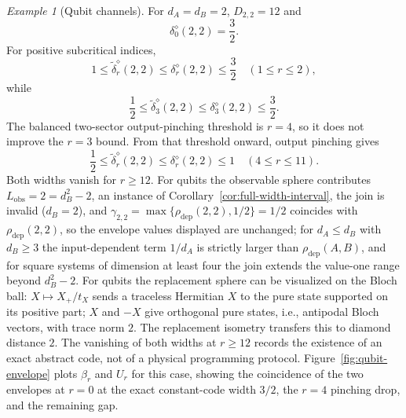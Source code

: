 \documentclass[11pt,a4paper]{article}
\theoremstyle{definition}
\theoremstyle{plain}
\theoremstyle{remark}
\newtheorem{example}[theorem]{Example}
\newcommand{\rhodep}{\rho_{\mathrm{dep}}}
\begin{document}
\begin{example}[Qubit channels]
\label{ex:qubit}
For $d_A=d_B=2$, $D_{2,2}=12$ and
\[
\delta_0^\diamond(2,2)=\frac32.
\]
For positive subcritical indices,
\[
1\leq\widetilde\delta_r^\diamond(2,2)
\leq\delta_r^\diamond(2,2)\leq\frac32
\quad(1\leq r\leq2),
\]
while
\[
\frac12\leq\widetilde\delta_3^\diamond(2,2)
\leq\delta_3^\diamond(2,2)\leq\frac32.
\]
The balanced two-sector output-pinching threshold is $r=4$, so it does not
improve the $r=3$ bound. From that threshold onward, output pinching gives
\[
\frac12\leq\widetilde\delta_r^\diamond(2,2)
\leq\delta_r^\diamond(2,2)\leq1
\quad(4\leq r\leq11).
\]
Both widths vanish for $r\geq12$. For qubits the observable sphere contributes $L_{\mathrm{obs}}=2=d_B^2-2$, an instance of Corollary~\ref{cor:full-width-interval}, the join is invalid ($d_B=2$), and $\gamma_{2,2}=\max\{\rhodep(2,2),1/2\}=1/2$ coincides with $\rhodep(2,2)$, so the envelope values displayed are unchanged; for $d_A\le d_B$ with $d_B\ge3$ the input-dependent term $1/d_A$ is strictly larger than $\rhodep(A,B)$, and for square systems of dimension at least four the join extends the value-one range beyond $d_B^2-2$. For qubits the replacement sphere can be visualized on the Bloch ball: $X\mapsto X_+/t_X$ sends a traceless Hermitian $X$ to the pure state supported on its positive part; $X$ and $-X$ give orthogonal pure states, i.e., antipodal Bloch vectors, with trace norm $2$. The replacement isometry transfers this to diamond distance $2$. The vanishing of both widths at $r\ge12$ records the existence of an exact abstract code, not of a physical programming protocol. Figure~\ref{fig:qubit-envelope} plots $\beta_r$ and $U_r$ for this case, showing the coincidence of the two envelopes at $r=0$ at the exact constant-code width $3/2$, the $r=4$ pinching drop, and the remaining gap.
\end{example}
\end{document}
